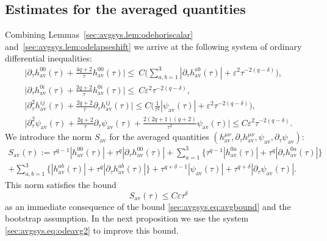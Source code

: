 \documentclass{article}
\newcommand{\av}{\mathrm{av}}
\newcommand{\ve}{\varepsilon}
\newcommand{\pa}{\partial}
\begin{document}
\subsection{Estimates for the averaged quantities}
Combining Lemmas~\ref{sec:avgsys.lem:odehoriscalar} and~\ref{sec:avgsys.lem:odelapseshift} we arrive at the following system of ordinary differential inequalities:
\begin{subequations}\label{sec:avgsys.eq:odeavg2}
    \begin{gather}
        \Big|\pa_\tau  h_{\av}^{00}(\tau) + \frac{4q+2}{\tau}h_{\av}^{00}(\tau)\Big| \leq\> C\Big(\sum_{a,b=1}^3|\pa_\tau h_{\av}^{ab}(\tau)| + \ve^2 \tau^{-2(q-\delta)}\Big),\label{sec:avgsys.eq:odeavglapse2}\\
        \Big|\pa_\tau   h_{\av}^{0i}(\tau) + \frac{2q+2}{\tau}  h_{\av}^{0i}(\tau)\Big| \leq\> C\ve^2\tau^{-2(q-\delta)},\label{sec:avgsys.eq:odeavgshift2}\\
        \Big|\pa_\tau^2 h_{\av}^{ij}(\tau) + \frac{2q+2}{\tau}\pa_\tau  h_{\av}^{ij}(\tau)\Big| \leq C\Big(\frac{1}{\tau^2}|\psi_{\av}(\tau)| + \ve^2\tau^{-2(q-\delta)}\Big),\label{sec:avgsys.eq:odeavghori2}\\
        \Big|\pa_\tau^2 \psi_{\av}(\tau) + \frac{2q+2}{\tau}\pa_\tau \psi_{\av}(\tau) + \frac{2(2q+1)(q+2)}{\tau^2}\psi_{\av}(\tau)\Big| \leq C\ve^2\tau^{-2(q-\delta)}.\label{sec:avgsys.eq:odeavgscalar2}
    \end{gather}
\end{subequations}
We introduce the norm $S_{\av}$ for the averaged quantities $(h_{\av}^{\mu\nu},\pa_\tau h_{\av}^{\mu\nu},\psi_{\av},\pa_\tau \psi_{\av})$:
\begin{multline}\label{sec:avgsys.eq:avgenergy}
    S_{\av}(\tau):= \tau^{q-1}|h_{\av}^{00}(\tau)| + \tau^{q}|\pa_\tau h_{\av}^{00}(\tau)| + \sum_{a=1}^3\Big\{\tau^{q-1}|h_{\av}^{0a}(\tau)| + \tau^q|\pa_\tau h_{\av}^{0a}(\tau)|\Big\}\\
    +\sum_{a,b=1}^3\Big\{|h_{\av}^{ab}(\tau)|+\tau^{q}|\pa_\tau h_{\av}^{ab}(\tau)|\Big\} + \tau^{q+\delta-1}|\psi_{\av}(\tau)|+\tau^{q+\delta}|\pa_\tau \psi_{\av}(\tau)|.
\end{multline}
This norm satisfies the bound 
\begin{equation}\label{sec:avgsys.eq:avgestrough}
    S_{\av}(\tau) \leq C\ve\tau^\delta
\end{equation}
as an immediate consequence of the bound \eqref{sec:avgsys.eq:avgbound} and the bootstrap assumption. In the next proposition we use the system \eqref{sec:avgsys.eq:odeavg2} to improve this bound.
\end{document}

